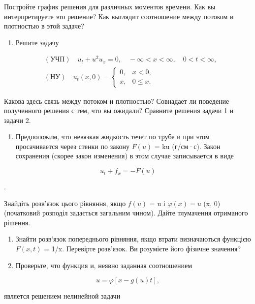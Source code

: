 \documentclass[
  ukrainian,
]{article}
\providecommand{\tightlist}{%
  \setlength{\itemsep}{0pt}\setlength{\parskip}{0pt}}
\begin{document}
Постройте график решения для различных моментов времени. Как вы
интерпретируете это решение? Как выглядит соотношение между потоком и
плотностью в этой задаче?

\begin{enumerate}
\def\labelenumi{\arabic{enumi}.}
\setcounter{enumi}{1}
\tightlist
\item
  Решите задачу
\end{enumerate}

\[
\begin{split} & (\text{УЧП}) \quad u_t + u^2 u_x = 0, \quad -\infty < x < \infty, \quad 0 < t < \infty, \\ & (\text{НУ}) \quad u_t(x, 0) = \begin{cases} 0, & x < 0, \\ x, & 0 \leqslant x. \end{cases} \end{split}
\]

Какова здесь связь между потоком и плотностью? Совнадает ли поведение
полученного решения с тем, что вы ожидали? Сравните решения задачи 1 и
задачи 2.

\begin{enumerate}
\def\labelenumi{\arabic{enumi}.}
\setcounter{enumi}{2}
\tightlist
\item
  Предположим, что невязкая жидкость течет по трубе и при этом
  просачивается через стенки по закону \(F(u)\) = ku (г/см·с). Закон
  сохранения (скорее закон изменения) в этом случае записывается в виде
\end{enumerate}

\[
u_t + f_x = -F(u)
\]

.

Знайдіть розв'язок цього рівняння, якщо \(f(u)\) = u і
\(\varphi(x) = u\) (x, 0) (початковий розподіл задається загальним
чином). Дайте тлумачення отриманого рішення.

\begin{enumerate}
\def\labelenumi{\arabic{enumi}.}
\setcounter{enumi}{3}
\item
  Знайти розв'язок попереднього рівняння, якщо втрати визначаються
  функцією \(F(x, t)\) = 1/x. Перевірте розв'язок. Ви розумієте його
  фізичне значення?
\item
  Проверьте, что функция и, неявно заданная соотношением
\end{enumerate}

\[
u = \varphi[x - g(u) t],
\]

является решением нелинейной задачи
\end{document}

